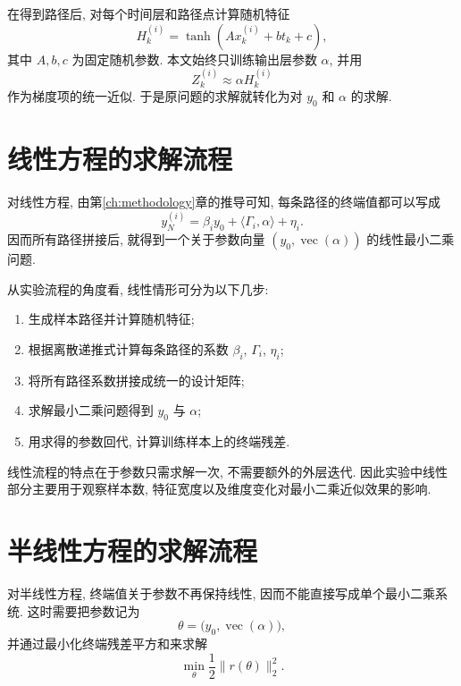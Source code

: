     在得到路径后, 对每个时间层和路径点计算随机特征
    \begin{equation*}
      H_{k}^{(i)} = \tanh(A x_{k}^{(i)} + b t_{k} + c),
    \end{equation*}
    其中 $A, b, c$ 为固定随机参数.
    本文始终只训练输出层参数 $\alpha$, 并用
    \begin{equation*}
      Z_{k}^{(i)} \approx \alpha H_{k}^{(i)}
    \end{equation*}
    作为梯度项的统一近似.
    于是原问题的求解就转化为对 $y_{0}$ 和 $\alpha$ 的求解.

  \section{线性方程的求解流程}\label{sec:exp_linear_flow}
    对线性方程, 由第\ref{ch:methodology}章的推导可知,
    每条路径的终端值都可以写成
    \begin{equation*}
      y_{N}^{(i)} = \beta_{i} y_{0} + \langle \Gamma_{i}, \alpha \rangle + \eta_{i}.
    \end{equation*}
    因而所有路径拼接后, 就得到一个关于参数向量 $(y_{0}, \operatorname{vec}(\alpha))$ 的线性最小二乘问题.

    从实验流程的角度看, 线性情形可分为以下几步:
    \begin{enumerate}
      \item 生成样本路径并计算随机特征;
      \item 根据离散递推式计算每条路径的系数 $\beta_{i}$, $\Gamma_{i}$, $\eta_{i}$;
      \item 将所有路径系数拼接成统一的设计矩阵;
      \item 求解最小二乘问题得到 $y_{0}$ 与 $\alpha$;
      \item 用求得的参数回代, 计算训练样本上的终端残差.
    \end{enumerate}

    线性流程的特点在于参数只需求解一次, 不需要额外的外层迭代.
    因此实验中线性部分主要用于观察样本数, 特征宽度以及维度变化对最小二乘近似效果的影响.

  \section{半线性方程的求解流程}\label{sec:exp_semilinear_flow}
    对半线性方程, 终端值关于参数不再保持线性, 因而不能直接写成单个最小二乘系统.
    这时需要把参数记为
    \begin{equation*}
      \theta = \bigl(y_{0}, \operatorname{vec}(\alpha)\bigr),
    \end{equation*}
    并通过最小化终端残差平方和来求解
    \begin{equation*}
      \min_{\theta} \frac{1}{2}\lVert r(\theta) \rVert_{2}^{2}.
    \end{equation*}

